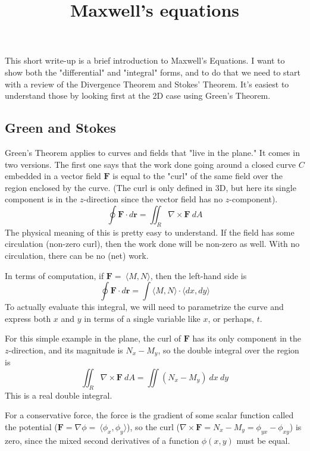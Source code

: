 \documentclass[11pt, oneside]{article}   	%
\title{Maxwell's equations}
\date{}							%
\begin{document}
\maketitle
\Large


This short write-up is a brief introduction to Maxwell's Equations.  I want to show both the "differential" and "integral" forms, and to do that we need to start with a review of the Divergence Theorem and Stokes' Theorem.  It's easiest to understand those by looking first at the 2D case using Green's Theorem.
\subsection*{Green and Stokes}
Green's Theorem applies to curves and fields that "live in the plane."  It comes in two versions.  The first one says that the work done going around a closed curve $C$ embedded in a vector field $\mathbf{F}$ is equal to the "curl" of the same field over the region enclosed by the curve.  (The curl is only defined in 3D, but here its single component is in the $z$-direction since the vector field has no $z$-component).
\[ \oint \mathbf{F} \cdot d \mathbf{r} = \iint_R \nabla \times \mathbf{F} \ dA \]
The physical meaning of this is pretty easy to understand.  If the field has some circulation (non-zero curl), then the work done will be non-zero as well.  With no circulation, there can be no (net) work.

In terms of computation, if $\mathbf{F} = \ \langle M, N \rangle$, then the left-hand side is 
\[ \oint \mathbf{F} \cdot d \mathbf{r} = \int \langle M, N \rangle \cdot \langle dx, dy \rangle \]
To actually evaluate this integral, we will need to parametrize the curve and express both $x$ and $y$ in terms of a single variable like $x$, or perhaps, $t$.

For this simple example in the plane, the curl of $\mathbf{F}$ has its only component in the $z$-direction, and its magnitude is $N_x - M_y$, so the double integral over the region is
\[ \iint_R \nabla \times \mathbf{F} \ dA = \iint (N_x - M_y) \ dx \ dy \]
This is a real double integral.

For a conservative force, the force is the gradient of some scalar function called the potential ($\mathbf{F} = \nabla \phi = \ \langle \phi_x, \phi_y \rangle$), so the curl ($\nabla \times \mathbf{F} = N_x - M_y = \phi_{yx} - \phi_{xy}$) is zero, since the mixed second derivatives of a function $\phi(x,y)$ must be equal.
\end{document}
